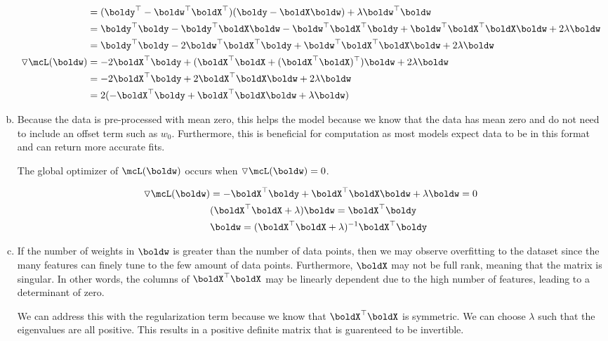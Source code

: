 \documentclass[submit]{harvardml}
\begin{document}
\begin{enumerate}[(a)]
\begin{align*}
        &= (\boldy^\top - \boldw^\top\boldX^\top) (\boldy - \boldX \boldw) + \lambda \boldw^\top \boldw \\
        &= \boldy^\top\boldy - \boldy^\top \boldX \boldw  -\boldw^\top \boldX^\top \boldy + \boldw^\top \boldX^\top \boldX \boldw  + 2 \lambda \boldw\\
        &= \boldy^\top\boldy -2\boldw^\top \boldX^\top \boldy + \boldw^\top \boldX^\top \boldX \boldw + 2 \lambda \boldw \\
        \triangledown \mcL(\boldw) &= -2 \boldX^\top \boldy + (\boldX^\top \boldX + (\boldX^\top \boldX)^\top) \boldw + 2 \lambda \boldw \\ 
         &= -2 \boldX^\top \boldy + 2\boldX^\top \boldX \boldw + 2 \lambda \boldw \\ 
         &= 2 ( -\boldX^\top \boldy + \boldX^\top \boldX \boldw +  \lambda \boldw) \\ 
    \end{align*}
    \item Because the data is pre-processed with mean zero, this helps the model because we know that the data has mean zero and do not need to include an offset term such as $w_0$. Furthermore, this is beneficial for computation as most models expect data to be in this format and can return more accurate fits.
    
    The global optimizer of $\mcL(\boldw)$ occurs when $\triangledown \mcL(\boldw) = 0$.
    
    \begin{align*}
        \triangledown \mcL(\boldw) &= -\boldX^\top \boldy + \boldX^\top \boldX \boldw +  \lambda \boldw = 0\\
        &(\boldX^\top \boldX + \lambda)\boldw = \boldX^\top \boldy\\
        &\boldw = (\boldX^\top \boldX + \lambda)^{-1} \boldX^\top \boldy
    \end{align*}
    
    \item If the number of weights in $\boldw$ is greater than the number of data points, then we may observe overfitting to the dataset since the many features can finely tune to the few amount of data points. Furthermore, $\boldX$ may not be full rank, meaning that the matrix is singular. In other words, the columns of $\boldX^\top \boldX$ may be linearly dependent due to the high number of features, leading to a determinant of zero. 
    
    We can address this with the regularization term because we know that $\boldX^\top \boldX$ is symmetric. We can choose $\lambda$ such that the eigenvalues are all positive. This results in a positive definite matrix that is guarenteed to be invertible.  
\end{enumerate}
\end{document}
